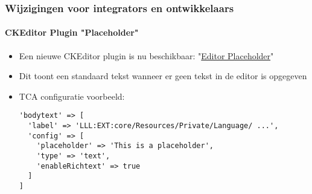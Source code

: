 %

\begin{frame}[fragile]
	\frametitle{Wijzigingen voor integrators en ontwikkelaars}
	\framesubtitle{CKEditor Plugin "Placeholder"}

	\lstset{basicstyle=\tiny\ttfamily}

	\begin{itemize}
		\item Een nieuwe CKEditor plugin is nu beschikbaar:
			"\href{https://ckeditor.com/docs/ckeditor4/latest/examples/editorplaceholder.html}{Editor Placeholder}"
		\item Dit toont een standaard tekst wanneer er geen tekst in de editor is opgegeven
		\item TCA configuratie voorbeeld:
\begin{lstlisting}
'bodytext' => [
  'label' => 'LLL:EXT:core/Resources/Private/Language/ ...',
  'config' => [
    'placeholder' => 'This is a placeholder',
    'type' => 'text',
    'enableRichtext' => true
  ]
]
\end{lstlisting}

	\end{itemize}

\end{frame}

